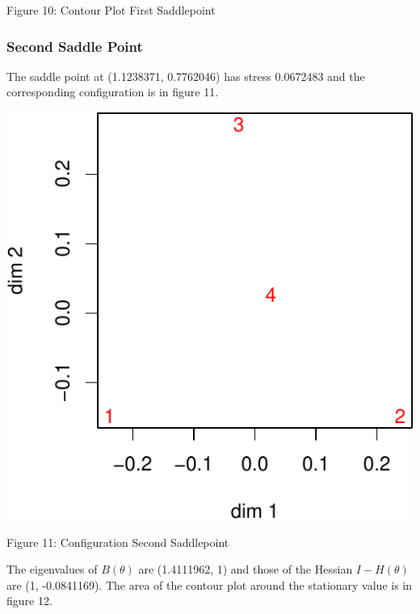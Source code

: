 \documentclass[
  12pt,
]{article}
\begin{document}
Figure 10: Contour Plot First Saddlepoint

\subsubsection{Second Saddle Point}\label{second-saddle-point}

The saddle point at (1.1238371, 0.7762046) has stress 0.0672483 and the corresponding configuration is in figure 11.

\begin{center}\includegraphics{twoPoints_files/figure-latex/configuration_second_saddlepoint-1} \end{center}

Figure 11: Configuration Second Saddlepoint

The eigenvalues of \(B(\theta)\) are (1.4111962, 1) and those of the Hessian \(I-H(\theta)\) are
(1, -0.0841169). The area of the contour plot around the stationary value is in figure 12.
\end{document}

